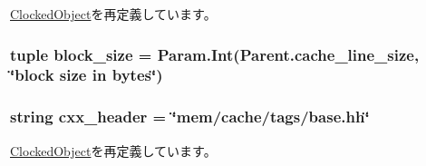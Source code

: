 \hyperlink{classClockedObject_1_1ClockedObject_a17fa61ac3806b481cafee5593b55e5d0}{ClockedObject}を再定義しています。\hypertarget{classTags_1_1BaseTags_abe33528b644980a2c72742ed1df2ef5d}{
\subsubsection[{block\_\-size}]{\setlength{\rightskip}{0pt plus 5cm}tuple {\bf block\_\-size} = Param.Int(Parent.cache\_\-line\_\-size, \char`\"{}block {\bf size} in bytes\char`\"{})}}
\label{classTags_1_1BaseTags_abe33528b644980a2c72742ed1df2ef5d}
\hypertarget{classTags_1_1BaseTags_a17da7064bc5c518791f0c891eff05fda}{
\subsubsection[{cxx\_\-header}]{\setlength{\rightskip}{0pt plus 5cm}string {\bf cxx\_\-header} = \char`\"{}mem/cache/tags/base.hh\char`\"{}}}
\label{classTags_1_1BaseTags_a17da7064bc5c518791f0c891eff05fda}


\hyperlink{classClockedObject_1_1ClockedObject_a17da7064bc5c518791f0c891eff05fda}{ClockedObject}を再定義しています。

